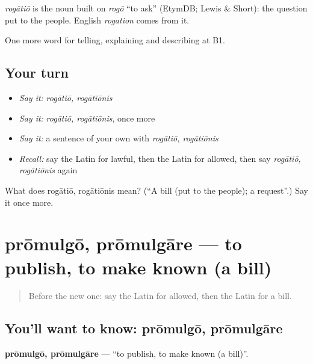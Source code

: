 \begin{cousinweb}
\emph{rogātiō} is the noun built on \emph{rogō} \textquotedblleft{}to ask\textquotedblright{} (EtymDB; Lewis \& Short): the question put to the people. English \emph{rogation} comes from it.
\end{cousinweb}

\begin{grammarlens}[title={What you've built}]
One more word for telling, explaining and describing at B1.
\end{grammarlens}

\subsection*{Your turn}
\begin{itemize}
\raggedright
  \item \emph{Say it:} \emph{rogātiō, rogātiōnis}
  \item \emph{Say it:} \emph{rogātiō, rogātiōnis}, once more
  \item \emph{Say it:} a sentence of your own with \emph{rogātiō, rogātiōnis}
  \item \emph{Recall:} say the Latin for lawful, then the Latin for allowed, then say \emph{rogātiō, rogātiōnis} again
\end{itemize}

\begin{tcolorbox}[breakable,colback=teal!4,colframe=teal!35!black,title={Before you move on}]
What does rogātiō, rogātiōnis mean? (\textquotedblleft{}A bill (put to the people); a request\textquotedblright{}.) Say it once more.
\end{tcolorbox}
\section[prōmulgō, prōmulgāre]{prōmulgō, prōmulgāre — to publish, to make known (a bill)}

\label{lesson:LA-C410-promulgo}



\begin{quote}
Before the new one: say the Latin for allowed, then the Latin for a bill.
\end{quote}

\subsection*{You'll want to know: prōmulgō, prōmulgāre}
\textbf{prōmulgō, prōmulgāre} — \textquotedblleft{}to publish, to make known (a bill)\textquotedblright{}.

